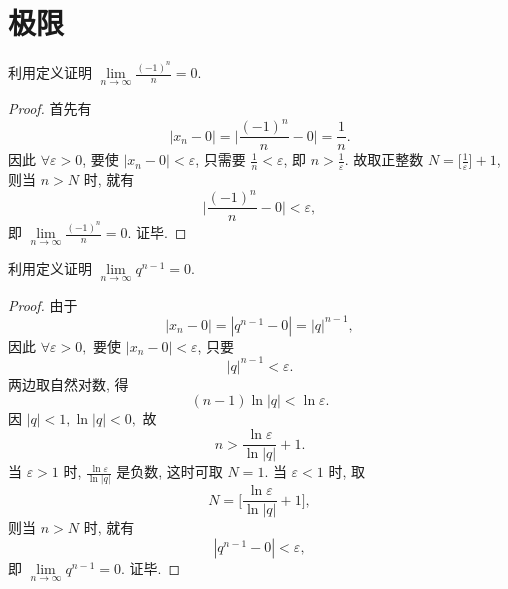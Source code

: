 \documentclass[color=green,titlestyle=hang]{elegantbook}%
\author{唐绍东 \& TangShaodong}
\begin{document}
\maketitle
\tableofcontents
\mainmatter


\chapter{极限}

\begin{example}
利用定义证明 $\lim\limits_{n\to \infty}\frac{(-1)^n}{n}=0$.
\end{example}\begin{proof}
首先有 $$|x_n-0|=\Big|\frac{(-1)^n}{n}-0\Big|=\frac{1}{n}.$$ 因此 $\forall \varepsilon >0$,
要使 $|x_n-0|<\varepsilon$, 只需要 $\frac{1}{n}<\varepsilon$, 即 $n>\frac{1}{\varepsilon}$.
故取正整数 $N=\Big[\frac{1}{\varepsilon}\Big]+1$, \\
则当 $n>N$ 时, 就有$$\Big|\frac{(-1)^n}{n}-0\Big|<\varepsilon,$$
即 $\lim\limits_{n\to \infty}\frac{(-1)^n}{n}=0$. 证毕.	
\end{proof}

\begin{example}
利用定义证明  $\lim\limits_{n\to \infty}q^{n-1}=0$.	
\end{example}\begin{proof}
由于 $$|x_n-0|=|q^{n-1}-0|=|q|^{n-1},$$ 因此 $\forall \varepsilon >0,$
要使 $|x_n-0|<\varepsilon$, 只要
$$|q|^{n-1}<\varepsilon.$$
两边取自然对数, 得 $$(n-1)\ln|q|<\ln\varepsilon.$$  因 $|q|<1, \ln|q|<0,$
故
$$n>\frac{\ln\varepsilon}{\ln|q|}+1.$$
当 $\varepsilon>1$ 时, $\frac{\ln \varepsilon}{\ln|q|}$ 是负数, 这时可取 $N=1$. 当 $\varepsilon<1$ 时, 取
$$N=\Big[\frac{\ln \varepsilon}{\ln|q|}+1\Big],$$
则当 $n>N$ 时, 就有
$$|q^{n-1}-0|<\varepsilon,$$
即 $\lim\limits_{n\to \infty}q^{n-1}=0$. 证毕.	
\end{proof}

\end{document}
